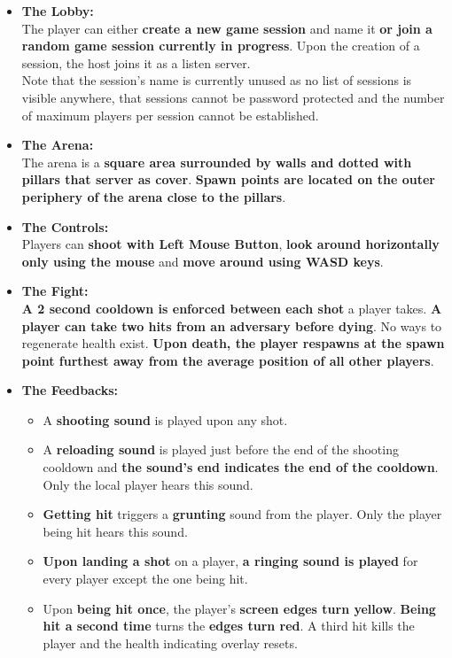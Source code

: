 \documentclass[12pt,a4paper]{article}
\begin{document}
\begin{itemize}
\item \textbf{The Lobby:}\\
The player can either \textbf{create a new game session} and name it \textbf{or join a random game session currently in progress}. Upon the creation of a session, the host joins it as a listen server.\\
Note that the session's name is currently unused as no list of sessions is visible anywhere, that sessions cannot be password protected and the number of maximum players per session cannot be established.
\item \textbf{The Arena:}\\
The arena is a \textbf{square area surrounded by walls and dotted with pillars that server as cover}. \textbf{Spawn points are located on the outer periphery of the arena close to the pillars}.
\item \textbf{The Controls:}\\
Players can \textbf{shoot with Left Mouse Button}, \textbf{look around horizontally only using the mouse} and \textbf{move around using WASD keys}.
\item \textbf{The Fight:}\\
\textbf{A 2 second cooldown is enforced between each shot} a player takes. \textbf{A player can take two hits from an adversary before dying}. No ways to regenerate health exist. \textbf{Upon death, the player respawns at the spawn point furthest away from the average position of all other players}.
\newpage
\item \textbf{The Feedbacks:}\\
\begin{itemize}
\item A \textbf{shooting sound} is played upon any shot.
\item A \textbf{reloading sound} is played just before the end of the shooting cooldown and \textbf{the sound's end indicates the end of the cooldown}. Only the local player hears this sound.
\item \textbf{Getting hit} triggers a \textbf{grunting} sound from the player. Only the player being hit hears this sound.
\item \textbf{Upon landing a shot} on a player, \textbf{a ringing sound is played} for every player except the one being hit.
\item Upon \textbf{being hit once}, the player's \textbf{screen edges turn yellow}. \textbf{Being hit a second time} turns the \textbf{edges turn red}. A third hit kills the player and the health indicating overlay resets.
\end{itemize}
\end{itemize}
\end{document}
